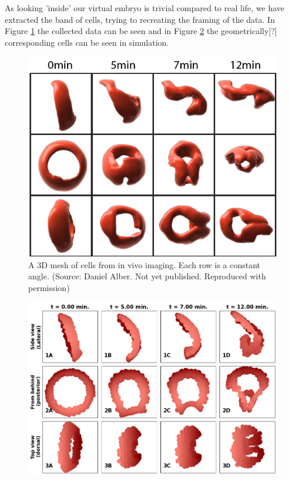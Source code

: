 As looking 'inside' our virtual embryo is trivial compared to real life, we have extracted the band of cells, trying to recreating the framing of the data. In Figure \ref{fig:daniel-cells} the collected data can be seen and in Figure \ref{fig:comparetodaniel} the geometrically[?] corresponding cells can be seen in simulation. 
\newpage
\begin{figure}[H]
    \centering
    \includegraphics[width=0.7 \linewidth]{chapters/Results/figures/DanielCut.png}
    \caption{A 3D mesh of cells from in vivo imaging. Each row is a constant angle. (Source: Daniel Alber. Not yet published. Reproduced with permission)}
    \label{fig:daniel-cells}
\end{figure}
\begin{figure}[H]
    \centering
    \includegraphics[width=0.8\linewidth]{chapters/Results/figures/CompareToDaniel.png}
    \caption{}
    \label{fig:comparetodaniel}
\end{figure}

